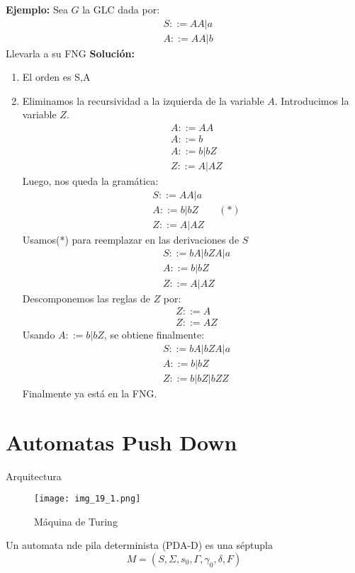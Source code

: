 \textbf{Ejemplo: }Sea $G$ la GLC dada por:
\begin{align*}
&S::=AA|a	\\
&A::=AA|b
\end{align*}
Llevarla a su FNG
\textbf{Solución: }
\begin{enumerate}
\item El orden es S,A
\item Eliminamos la recursividad a la izquierda de la variable $A$. Introducimos la variable $Z$.
\begin{align*}
&A::=AA	\\
&A::=b	\\
&A::=b|bZ	\\
&Z::=A|AZ
\end{align*}
Luego, nos queda la gramática:
\begin{align*}
&S::=AA|a	\\
&A::=b|bZ	\qquad(*)	\\
&Z::=A|AZ
\end{align*}
Usamos(*) para reemplazar en las derivaciones de $S$
\begin{align*}
&S::=bA|bZA|a	\\
&A::=b|bZ	\\
&Z::=A|AZ
\end{align*}
Descomponemos las reglas de $Z$ por: 
\begin{align*}
&Z::=A	\\
&Z::=AZ	
\end{align*}
Usando $A::=b|bZ$, se obtiene finalmente:
\begin{align*}
&S::=bA|bZA|a	\\
&A::=b|bZ	\\
&Z::=b|bZ|bZZ
\end{align*}
Finalmente ya está en la FNG.
\end{enumerate}



\section{Automatas Push Down}

Arquitectura
\begin{figure}[h!]
\centering
\texttt{[image: img\_19\_1.png]}
\caption{Máquina de Turing}\label{img_19_1}
\end{figure}

Un automata nde pila determinista (PDA-D) es una séptupla $$M=(S,\Sigma,s_0,\Gamma,\gamma_0,\delta,F)$$


